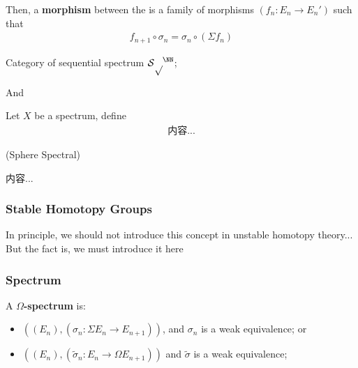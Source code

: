 \documentclass[Total.tex]{subfiles}
\begin{document}
					Then, a \textbf{morphism} between the is a family of morphisms $(f_n:E_n\rightarrow E_n')$ such that
					\begin{gather*}
						f_{n+1}\circ\sigma_n=\sigma_n\circ (\Sigma f_n)
					\end{gather*}
					
					\begin{center}
					\end{center}
					
					\begin{Def}
						Category of sequential spectrum $\mathcal{Sp}^\NN$;
					\end{Def}
					
					And
					\begin{Def}
						Let $X$ be a spectrum, define
						\begin{gather*}
							内容...
						\end{gather*}
					\end{Def}
					
					
					\begin{example}
						(Sphere Spectral)
					\end{example}
					
					\begin{theorem}
						内容...
					\end{theorem}
					
				\subsubsection{Stable Homotopy Groups}
					In principle, we should not introduce this concept in unstable homotopy theory... But the fact is, we must introduce it here
					
					\begin{Def}
						
					\end{Def}
				\subsubsection{Spectrum}
				\begin{Def}
					A \textbf{$\Omega$-spectrum} is:
					\begin{itemize}
						\item $((E_n),(\sigma_n:\Sigma E_n\rightarrow E_{n+1}))$, and $\sigma_n$ is a weak equivalence; or
						\item $((E_n),(\tilde{\sigma}_n:E_n\rightarrow \Omega E_{n+1}))$ and $\tilde{\sigma}$ is a weak equivalence;
					\end{itemize}
				\end{Def}
				
\end{document}
